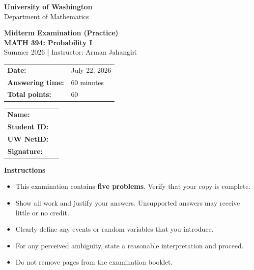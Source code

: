 \documentclass[11pt]{article}
\newcommand{\course}{MATH 394: Probability I}
\newcommand{\instructor}{Arman Jahangiri}
\newcommand{\department}{Department of Mathematics}
\newcommand{\university}{University of Washington}
\begin{document}
\begin{titlepage}
\centering
\vspace*{0.05cm}

{\Large \textbf{\university}}\\
{\large \department}

\vspace{0.28cm}

{\LARGE \color{uwpurple}\textbf{Midterm Examination (Practice)}}\\[0.15cm]
{\Large \textbf{\course}}\\[0.15cm]
{\large Summer 2026 \quad | \quad Instructor: \instructor}

\vspace{0.22cm}

\begin{tcolorbox}[
    width=0.94\textwidth,
    colback=softpurple,
    colframe=uwpurple,
    boxrule=0.9pt,
    arc=3mm
]
\centering
\renewcommand{\arraystretch}{1.15}
\begin{tabular}{>{\bfseries}p{}p{}}
Date: & July 22, 2026 \\
Answering time: & 60 minutes \\
Total points: & 60 \\
\end{tabular}
\end{tcolorbox}

\vspace{0.18cm}

\begin{tcolorbox}[
    width=0.94\textwidth,
    colback=white,
    colframe=uwgold,
    boxrule=0.8pt,
    arc=3mm
]
\renewcommand{\arraystretch}{1.35}
\begin{tabular}{>{\bfseries}p{}p{}}
Name: & \hrulefill \\
Student ID: & \hrulefill \\
UW NetID: & \hrulefill \\
Signature: & \hrulefill \\
\end{tabular}
\end{tcolorbox}

\vspace{0.15cm}

\begin{policybox}
\small
\textbf{Instructions}
\begin{itemize}[leftmargin=*,itemsep=0.05em,topsep=0.15em,parsep=0pt]
    \item This examination contains \textbf{five problems}. Verify that your copy is complete.
    \item Show all work and justify your answers. Unsupported answers may receive little or no credit.
    \item Clearly define any events or random variables that you introduce.    
    \item For any perceived ambiguity, state a reasonable interpretation and proceed.
    \item Do not remove pages from the examination booklet.
\end{itemize}


\end{policybox}
\end{titlepage}
\end{document}
